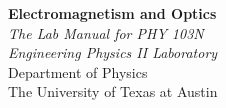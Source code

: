 \documentclass[12pt]{article}
\begin{document}
\vspace*{5cm}
\begin{center}
{\Huge \bf Electromagnetism and Optics} \\
\vspace*{1cm}
{\Large \it The Lab Manual for PHY 103N \\
Engineering Physics II Laboratory }\\
\vspace*{5cm}
{\large Department of Physics\\
The University of Texas at Austin}
\end{center}
\end{document}
